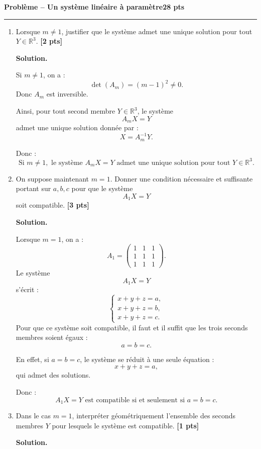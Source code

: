 \documentclass[11pt,a4paper]{article}
\newcommand{\pts}[1]{\hfill \textbf{[#1 pts]}}
\newcommand{\R}{\mathbb{R}}
\newcounter{probleme}
\newenvironment{probleme}[2]{
    \refstepcounter{probleme}
    \vspace{0.6cm}
    {\Large\color{bleu}\textbf{Problème \theprobleme{} -- #1}}\hfill \textbf{#2 pts}
    \par\medskip
    \hrule
    \medskip
}{\vspace{0.5cm}}
\newcommand{\solution}{
    \textbf{\color{bleu}Solution. }
}
\begin{document}
\begin{probleme}{Un système linéaire à paramètre}{28}
\begin{enumerate}[resume]
    \item Lorsque \(m\neq 1\), justifier que le système admet une unique solution pour tout \(Y\in\R^3\). \pts{2}

    \solution

    Si \(m\neq 1\), on a :
    \[
    \det(A_m)=(m-1)^2\neq 0.
    \]
    Donc \(A_m\) est inversible.

    Ainsi, pour tout second membre \(Y\in\R^3\), le système
    \[
    A_mX=Y
    \]
    admet une unique solution donnée par :
    \[
    X=A_m^{-1}Y.
    \]

    Donc :
    \[
    \boxed{\text{Si }m\neq 1,\text{ le système }A_mX=Y\text{ admet une unique solution pour tout }Y\in\R^3.}
    \]

    \item On suppose maintenant \(m=1\). Donner une condition nécessaire et suffisante portant sur \(a,b,c\) pour que le système
    \[
    A_1X=Y
    \]
    soit compatible. \pts{3}

    \solution

    Lorsque \(m=1\), on a :
    \[
    A_1=
    \begin{pmatrix}
    1&1&1\\
    1&1&1\\
    1&1&1
    \end{pmatrix}.
    \]
    Le système
    \[
    A_1X=Y
    \]
    s'écrit :
    \[
    \begin{cases}
    x+y+z=a,\\
    x+y+z=b,\\
    x+y+z=c.
    \end{cases}
    \]
    Pour que ce système soit compatible, il faut et il suffit que les trois seconds membres soient égaux :
    \[
    a=b=c.
    \]

    En effet, si \(a=b=c\), le système se réduit à une seule équation :
    \[
    x+y+z=a,
    \]
    qui admet des solutions.

    Donc :
    \[
    \boxed{A_1X=Y\text{ est compatible si et seulement si }a=b=c.}
    \]

    \item Dans le cas \(m=1\), interpréter géométriquement l'ensemble des seconds membres \(Y\) pour lesquels le système est compatible. \pts{1}

    \solution


\end{enumerate}
\end{probleme}
\end{document}
